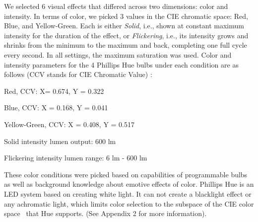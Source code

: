 \documentclass{llncs}
\begin{document}
We selected 6 visual effects that differed across two dimensions: color and intensity. 
In terms of color, we picked 3 values in the CIE chromatic space: Red, Blue, and Yellow-Green.
Each is either {\em Solid}, i.e., shown at constant  maximum intensity for the duration of the effect, 
or {\em Flickering}, i.e., its intensity grows and shrinks from the minimum to the maximum and back, 
completing one full cycle every second. In all settings, the maximum saturation was used. 
Color and intensity parameters for the 4 Phillips Hue bulbs under each condition are as follows
(CCV stands for CIE Chromatic Value) \cite{wyszecki1982color}: 
%
\begin{compactenum}
\item Red, CCV: X= 0.674, Y = 0.322
\item Blue, CCV: X = 0.168, Y = 0.041
\item Yellow-Green, CCV: X = 0.408, Y = 0.517
\item Solid intensity lumen output: 600 lm	
\item Flickering intensity lumen range: 6 lm - 600 lm
%
\end{compactenum}
%
These color conditions were picked based on capabilities of programmable bulbs 
as well as background knowledge about emotive effects of color. Phillips Hue
is an LED system based on creating white light. It can not create a blacklight effect
or any achromatic light, which limits color selection to the subspace of the CIE 
color space~\cite{wyszecki1982color} that Hue supports. (See Appendix 2 for more information). 
\end{document}
